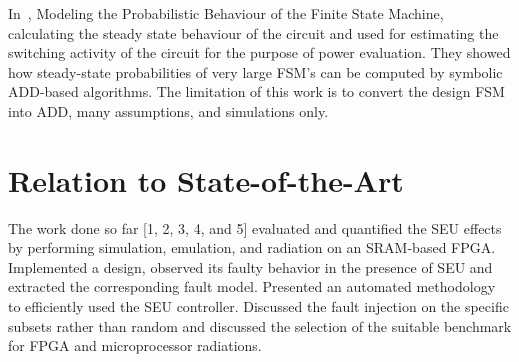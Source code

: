 In~\cite{hachtel1996markovian}, Modeling the Probabilistic Behaviour of the Finite State Machine, calculating the steady state
behaviour of the circuit and used for estimating the switching activity of the circuit for the purpose of
power evaluation. They showed how steady-state probabilities of very large FSM’s can be computed by
symbolic ADD-based algorithms. The limitation of this work is to convert the design FSM into ADD, many assumptions, and simulations only.










\section{Relation to State-of-the-Art}
The work done so far [1, 2, 3, 4, and 5] evaluated and quantified the SEU effects by performing simulation, emulation, and radiation on an SRAM-based FPGA. Implemented a design, observed its faulty behavior in the presence of SEU and extracted the corresponding fault model. Presented an automated methodology to efficiently used the SEU controller. Discussed the fault injection on the specific subsets rather than random and discussed the selection of the suitable benchmark for FPGA and microprocessor radiations. 




